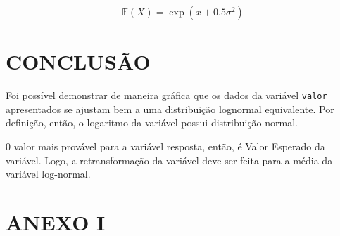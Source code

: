\documentclass[a4paper]{article}
\begin{document}
\[\mathbb{E}(X) = \exp(x + 0.5\sigma^2)\]

\section{CONCLUSÃO}\label{conclusao}

Foi possível demonstrar de maneira gráfica que os dados da variável
\texttt{valor} apresentados se ajustam bem a uma distribuição lognormal
equivalente. Por definição, então, o logaritmo da variável possui
distribuição normal.

0 valor mais provável para a variável resposta, então, é Valor Esperado
da variável. Logo, a retransformação da variável deve ser feita para a
média da variável log-normal.

\newpage

\hypertarget{anexo-i}{\section*{ANEXO I}\label{anexo-i}}
\end{document}
